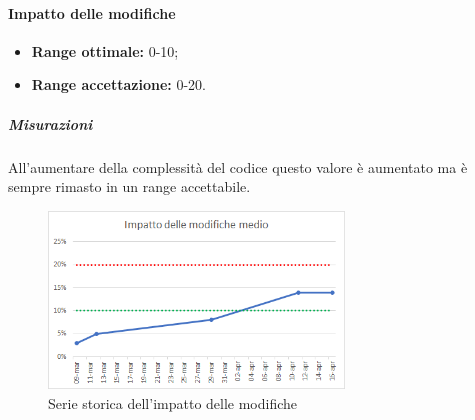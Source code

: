 			\paragraph{Impatto delle modifiche} \Spazio
			\begin{itemize}
				\item {\textbf{Range ottimale:} 0-10;}
				\item {\textbf{Range accettazione:} 0-20.}
			\end{itemize} 
		 \subparagraph{Misurazioni}
		 All'aumentare della complessità del codice questo valore è aumentato ma è sempre rimasto in un range accettabile.
		\begin{figure}[H]
			\centering 
			\includegraphics[width=0.7\textwidth]{Images/modifiche.png}
			\caption{Serie storica dell'impatto delle modifiche}
			\label{modifiche} 
		\end{figure}
	    
